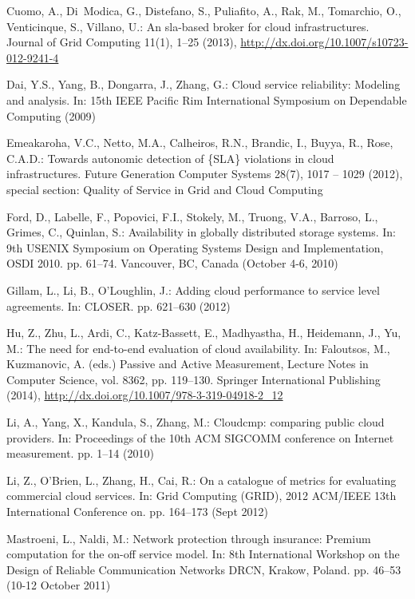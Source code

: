 \documentclass[runningheads,a4paper]{llncs}
\begin{document}
\begin{thebibliography}{10}
Cuomo, A., Di~Modica, G., Distefano, S., Puliafito, A., Rak, M., Tomarchio, O.,
  Venticinque, S., Villano, U.: An sla-based broker for cloud infrastructures.
  Journal of Grid Computing  11(1),  1--25 (2013),
  \url{http://dx.doi.org/10.1007/s10723-012-9241-4}

Dai, Y.S., Yang, B., Dongarra, J., Zhang, G.: Cloud service reliability:
  Modeling and analysis. In: 15th IEEE Pacific Rim International Symposium on
  Dependable Computing (2009)

Emeakaroha, V.C., Netto, M.A., Calheiros, R.N., Brandic, I., Buyya, R., Rose,
  C.A.D.: Towards autonomic detection of \{SLA\} violations in cloud
  infrastructures. Future Generation Computer Systems  28(7),  1017 -- 1029
  (2012), special section: Quality of Service in Grid and Cloud Computing

Ford, D., Labelle, F., Popovici, F.I., Stokely, M., Truong, V.A., Barroso, L.,
  Grimes, C., Quinlan, S.: Availability in globally distributed storage
  systems. In: 9th USENIX Symposium on Operating Systems Design and
  Implementation, OSDI 2010. pp. 61--74. Vancouver, BC, Canada (October 4-6,
  2010)

Gillam, L., Li, B., O'Loughlin, J.: Adding cloud performance to service level
  agreements. In: CLOSER. pp. 621--630 (2012)

Hu, Z., Zhu, L., Ardi, C., Katz-Bassett, E., Madhyastha, H., Heidemann, J., Yu,
  M.: The need for end-to-end evaluation of cloud availability. In: Faloutsos,
  M., Kuzmanovic, A. (eds.) Passive and Active Measurement, Lecture Notes in
  Computer Science, vol. 8362, pp. 119--130. Springer International Publishing
  (2014), \url{http://dx.doi.org/10.1007/978-3-319-04918-2_12}

Li, A., Yang, X., Kandula, S., Zhang, M.: Cloudcmp: comparing public cloud
  providers. In: Proceedings of the 10th ACM SIGCOMM conference on Internet
  measurement. pp. 1--14 (2010)

Li, Z., O'Brien, L., Zhang, H., Cai, R.: On a catalogue of metrics for
  evaluating commercial cloud services. In: Grid Computing (GRID), 2012
  ACM/IEEE 13th International Conference on. pp. 164--173 (Sept 2012)

Mastroeni, L., Naldi, M.: Network protection through insurance: Premium
  computation for the on-off service model. In: 8th International Workshop on
  the Design of Reliable Communication Networks DRCN, Krakow, Poland. pp.
  46--53 (10-12 October 2011)


\end{thebibliography}
\end{document}
